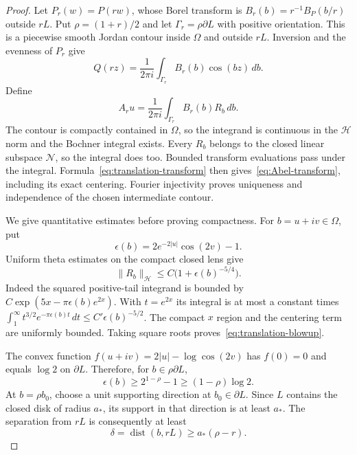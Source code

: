 \documentclass[11pt,a4paper]{article}
\numberwithin{equation}{section}
\theoremstyle{definition}
\theoremstyle{remark}
\newcommand{\Hh}{\mathcal H}
\newcommand{\Nn}{\mathcal N}
\newcommand{\norm}[1]{\lVert #1\rVert}
\begin{document}
\begin{proof}
Let $P_r(w)=P(rw)$, whose Borel transform is
$B_r(b)=r^{-1}B_P(b/r)$ outside $rL$. Put $\rho=(1+r)/2$ and let
$\Gamma_r=\rho\partial L$ with positive orientation. This is a piecewise smooth Jordan contour inside $\Omega$ and outside $rL$. Inversion and the evenness of $P_r$ give
\[
 Q(rz)=\frac1{2\pi i}\int_{\Gamma_r}B_r(b)\cos(bz)\,db.
\]
Define
\begin{equation}\label{eq:Abel-Bochner}
 A_ru=\frac1{2\pi i}\int_{\Gamma_r}B_r(b)R_b\,db.
\end{equation}
The contour is compactly contained in $\Omega$, so the integrand is continuous in the $\Hh$ norm and the Bochner integral exists. Every $R_b$ belongs to the closed linear subspace $\Nn$, so the integral does too. Bounded transform evaluations pass under the integral. Formula~\eqref{eq:translation-transform} then gives~\eqref{eq:Abel-transform}, including its exact centering. Fourier injectivity proves uniqueness and independence of the chosen intermediate contour.

We give quantitative estimates before proving compactness. For $b=u+iv\in\Omega$, put
\[
 \epsilon(b)=2e^{-2|u|}\cos(2v)-1.
\]
Uniform theta estimates on the compact closed lens give
\begin{equation}\label{eq:translation-blowup}
 \norm{R_b}_{\Hh}\le C\bigl(1+\epsilon(b)^{-5/4}\bigr).
\end{equation}
Indeed the squared positive-tail integrand is bounded by
$C\exp(5x-\pi\epsilon(b)e^{2x})$. With $t=e^{2x}$ its integral is at most a constant times
$\int_1^\infty t^{3/2}e^{-\pi\epsilon(b)t}\,dt
 \le C'\epsilon(b)^{-5/2}$.
The compact $x$ region and the centering term are uniformly bounded. Taking square roots proves~\eqref{eq:translation-blowup}.

The convex function $f(u+iv)=2|u|-\log\cos(2v)$ has $f(0)=0$ and equals $\log2$ on $\partial L$. Therefore, for $b\in\rho\partial L$,
\begin{equation}\label{eq:radial-epsilon}
 \epsilon(b)\ge 2^{1-\rho}-1\ge(1-\rho)\log2.
\end{equation}
At $b=\rho b_0$, choose a unit supporting direction at $b_0\in\partial L$. Since $L$ contains the closed disk of radius $a_*$, its support in that direction is at least $a_*$. The separation from $rL$ is consequently at least
\begin{equation}\label{eq:contour-separation}
 \delta=\operatorname{dist}(b,rL)\ge a_*(\rho-r).
\end{equation}


\end{proof}
\end{document}
